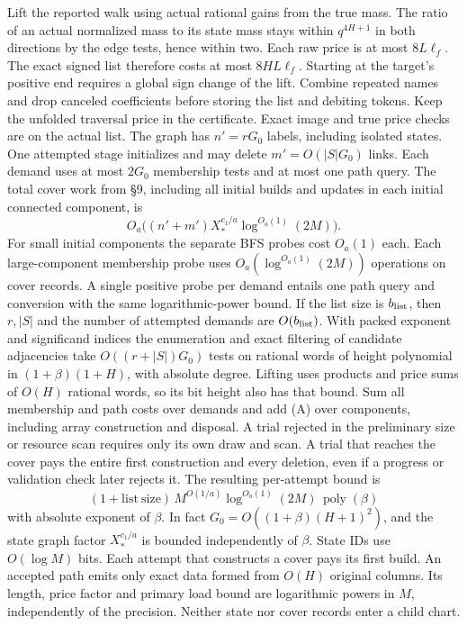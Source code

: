 \documentclass[11pt]{article}
\begin{document}
Lift the reported walk using actual rational gains from the true mass. The ratio of an actual normalized mass to its state mass stays within \(q^{4H+1}\) in both directions by the edge tests, hence within two. Each raw price is at most \(8L\ell_f\). The exact signed list therefore costs at most \(8HL\ell_f\). Starting at the target's positive end requires a global sign change of the lift. Combine repeated names and drop canceled coefficients before storing the list and debiting tokens. Keep the unfolded traversal price in the certificate. Exact image and true price checks are on the actual list. The graph has \(n'=rG_0\) labels, including isolated states. One attempted stage initializes and may delete \(m'=O(|S|G_0)\) links. Each demand uses at most \(2G_0\) membership tests and at most one path query. The total cover work from §9, including all initial builds and updates in each initial connected component, is
\[
 O_a\big((n'+m')X_*^{c_1/a}\log^{O_a(1)}(2M)\big).
\]
For small initial components the separate BFS probes cost \(O_a(1)\) each. Each large-component membership probe uses \(O_a(\log^{O_a(1)}(2M))\) operations on cover records. A single positive probe per demand entails one path query and conversion with the same logarithmic-power bound. If the list size is \(b_{\rm list}\), then \(r,|S|\) and the number of attempted demands are \(O(b_{\rm list})\). With packed exponent and significand indices the enumeration and exact filtering of candidate adjacencies take \(O((r+|S|)G_0)\) tests on rational words of height polynomial in \((1+\beta)(1+H)\), with absolute degree. Lifting uses products and price sums of \(O(H)\) rational words, so its bit height also has that bound. Sum all membership and path costs over demands and add (A) over components, including array construction and disposal. A trial rejected in the preliminary size or resource scan requires only its own draw and scan. A trial that reaches the cover pays the entire first construction and every deletion, even if a progress or validation check later rejects it. The resulting per-attempt bound is
\[
 (1+\mathrm{list\ size})\,M^{O(1/a)}\log^{O_a(1)}(2M)\,\operatorname{poly}(\beta)
\tag{5}
\]
with absolute exponent of \(\beta\). In fact \(G_0=O((1+\beta)(H+1)^2)\), and the state graph factor \(X_*^{c_1/a}\) is bounded independently of \(\beta\). State IDs use \(O(\log M)\) bits. Each attempt that constructs a cover pays its first build. An accepted path emits only exact data formed from \(O(H)\) original columns. Its length, price factor and primary load bound are logarithmic powers in \(M\), independently of the precision. Neither state nor cover records enter a child chart.
\end{document}
